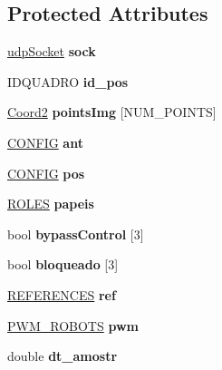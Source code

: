 \subsection*{Protected Attributes}
\begin{DoxyCompactItemize}
\item 
\hyperlink{classudpSocket}{udp\+Socket} {\bfseries sock}\hypertarget{classFutData_ad170223b4a244718da8c4b7ecdc91deb}{}\label{classFutData_ad170223b4a244718da8c4b7ecdc91deb}

\item 
I\+D\+Q\+U\+A\+D\+RO {\bfseries id\+\_\+pos}\hypertarget{classFutData_a535aebb460e975fa1c85d772d5513359}{}\label{classFutData_a535aebb460e975fa1c85d772d5513359}

\item 
\hyperlink{structCoord2}{Coord2} {\bfseries points\+Img} \mbox{[}N\+U\+M\+\_\+\+P\+O\+I\+N\+TS\mbox{]}\hypertarget{classFutData_a0d4ad6e6798281f4c7e80f1c121134ce}{}\label{classFutData_a0d4ad6e6798281f4c7e80f1c121134ce}

\item 
\hyperlink{structCONFIG}{C\+O\+N\+F\+IG} {\bfseries ant}\hypertarget{classFutData_aaaa972ffbcf98143b157714fbd7fad2c}{}\label{classFutData_aaaa972ffbcf98143b157714fbd7fad2c}

\item 
\hyperlink{structCONFIG}{C\+O\+N\+F\+IG} {\bfseries pos}\hypertarget{classFutData_a720091bea010139499bed2eae17a9081}{}\label{classFutData_a720091bea010139499bed2eae17a9081}

\item 
\hyperlink{structROLES}{R\+O\+L\+ES} {\bfseries papeis}\hypertarget{classFutData_a62ba1c29fd9a603e399b694638c55a80}{}\label{classFutData_a62ba1c29fd9a603e399b694638c55a80}

\item 
bool {\bfseries bypass\+Control} \mbox{[}3\mbox{]}\hypertarget{classFutData_a0dd952e41927ebb0b28ee949e2f6c827}{}\label{classFutData_a0dd952e41927ebb0b28ee949e2f6c827}

\item 
bool {\bfseries bloqueado} \mbox{[}3\mbox{]}\hypertarget{classFutData_aa13e681d7f32fbc4993df4acc6bc951a}{}\label{classFutData_aa13e681d7f32fbc4993df4acc6bc951a}

\item 
\hyperlink{structREFERENCES}{R\+E\+F\+E\+R\+E\+N\+C\+ES} {\bfseries ref}\hypertarget{classFutData_a04a2754923f575b9a9ca16b546dd2272}{}\label{classFutData_a04a2754923f575b9a9ca16b546dd2272}

\item 
\hyperlink{structPWM__ROBOTS}{P\+W\+M\+\_\+\+R\+O\+B\+O\+TS} {\bfseries pwm}\hypertarget{classFutData_a84ed66b223eb250040330813e9d23f76}{}\label{classFutData_a84ed66b223eb250040330813e9d23f76}

\item 
double {\bfseries dt\+\_\+amostr}\hypertarget{classFutData_a1ae215727d2cfc5f6f99c13efe529738}{}\label{classFutData_a1ae215727d2cfc5f6f99c13efe529738}

\end{DoxyCompactItemize}
